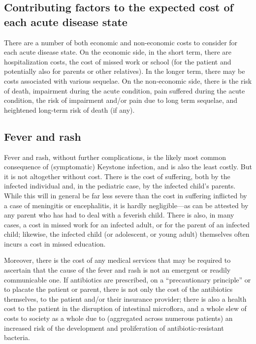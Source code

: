 \documentclass[12pt]{article}
\newcommand{\cjh}{\textcolor{blue}{cjh}}
\newcommand{\msg}[3]{(#1 $\rightarrow$ #2: #3)}
\newcommand{\mcc}[1]{\msg\cjh\cjh{#1}}
\begin{document}


        \subsection{Contributing factors to the expected cost of each acute disease state}
            \label{cost-factors}
            There are a number of both economic and non-economic costs to consider for each acute disease state. On the economic side, in the short term, there are hospitalization costs, the cost of missed work or school (for the patient and potentially also for parents or other relatives). In the longer term, there may be costs associated with various sequelae. On the non-economic side, there is the risk of death, impairment during the acute condition, pain suffered during the acute condition, the risk of impairment and/or pain due to long term sequelae, and heightened long-term risk of death (if any).

        \subsection{Fever and rash}
            \label{cost-fever}
            Fever and rash, without further complications, is the likely most common consequence of (symptomatic) Keystone infection, and is also the least costly. But it is not altogether without cost. There is the cost of suffering, both by the infected individual and, in the pediatric case, by the infected child's parents. While this will in general be far less severe than the cost in suffering inflicted by a case of meningitis or encephalitis, it is hardly negligible---as can be attested by any parent who has had to deal with a feverish child. There is also, in many cases, a cost in missed work for an infected adult, or for the parent of an infected child; likewise, the infected child (or adolescent, or young adult) themselves often incurs a cost in missed education.

            Moreover, there is the cost of any medical services that may be required to ascertain that the cause of the fever and rash is not an emergent or readily communicable one. If antibiotics are prescribed, on a ``precautionary principle'' or to placate the patient or parent, there is not only the cost of the antibiotics themselves, to the patient and/or their insurance provider; there is also a health cost to the patient in the disruption of intestinal microflora, and a whole slew of costs to society as a whole due to (aggregated across numerous patients) an increased risk of the development and proliferation of antibiotic-resistant bacteria.
\end{document}
